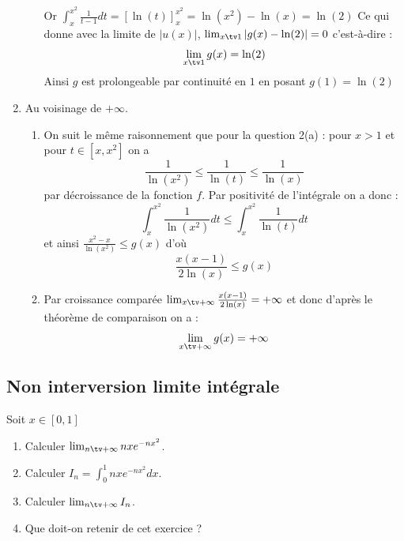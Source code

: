 \begin{correction}
\begin{enumerate}
\begin{enumerate}
Or $\int_x^{x^2} \frac{1}{t-1}dt = [\ln(t)]_x^{x^2} = \ln(x^2) -\ln(x) =\ln(2)$
Ce qui donne avec la limite de $|u(x)|$, $\lim_{x\tv 1} |g(x)-\ln(2)| =0$ 
c'est-à-dire :
$$\lim_{x\tv 1} g(x) =\ln(2)$$
Ainsi $g$ est prolongeable par continuité en $1$ en posant $g(1)  = \ln(2)$ 

\end{enumerate}
\item Au voisinage de $+\infty$. 
\begin{enumerate}
\item On suit le même raisonnement que pour la question 2(a) : pour $x>1$ et pour $t\in [x,x^2]$ on a 
$$\frac{1}{\ln(x^2)} \leq \frac{1}{\ln(t)}\leq \frac{1}{\ln(x)}$$
par décroissance de la fonction $f$. 
Par positivité de l'intégrale on a donc :
$$\int_x^{x^2} \frac{1}{\ln(x^2)} dt \leq\int_x^{x^2}  \frac{1}{\ln(t)}dt$$
et ainsi 
$\frac{x^2-x}{\ln(x^2)}\leq g(x)$
d'où 
$$\frac{x(x-1)}{2\ln(x)}\leq g(x)$$

\item Par croissance comparée $\lim_{x\tv +\infty} \frac{x(x-1)}{2\ln(x)}= +\infty$ et donc d'après le théorème de comparaison on a : 
$$\lim_{x\tv +\infty}g(x) =+\infty$$


\end{enumerate}


\end{enumerate}
\end{correction}






\subsection{Non interversion limite intégrale}
\begin{exercice}
Soit $x\in [0,1]$ 

\begin{enumerate}
\item Calculer $\lim_{n\tv+\infty} nxe^{-nx^2}$.
\item Calculer $I_n=\int_0^1 nxe^{-nx^2}dx$.
\item Calculer $\lim_{n\tv+\infty} I_n$.
\item Que doit-on retenir de cet exercice ? 
\end{enumerate}
\end{exercice}



